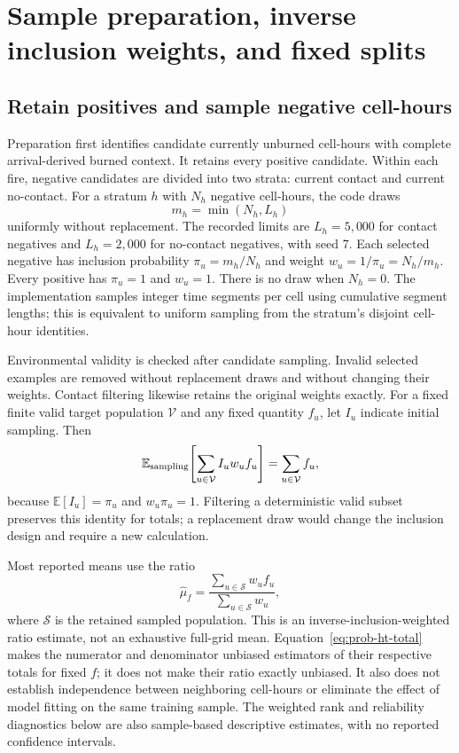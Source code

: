 \documentclass[11pt,a4paper]{article}
\newcommand{\E}{\mathbb{E}}
\begin{document}
\section{Sample preparation, inverse inclusion weights, and fixed splits}
\label{sec:probability-preparation}

\subsection{Retain positives and sample negative cell-hours}

Preparation first identifies candidate currently unburned cell-hours with
complete arrival-derived burned context. It retains every positive candidate.
Within each fire, negative candidates are divided into two strata: current
contact and current no-contact. For a stratum $h$ with $N_h$ negative
cell-hours, the code draws
\begin{equation}
 m_h=\min(N_h,L_h)
\end{equation}
uniformly without replacement. The recorded limits are $L_h=5{,}000$ for
contact negatives and $L_h=2{,}000$ for no-contact negatives, with seed 7.
Each selected negative has inclusion probability $\pi_u=m_h/N_h$ and
weight $w_u=1/\pi_u=N_h/m_h$. Every positive has $\pi_u=1$ and $w_u=1$.
There is no draw when $N_h=0$. The implementation samples integer time
segments per cell using cumulative segment lengths; this is equivalent to
uniform sampling from the stratum's disjoint cell-hour identities.

Environmental validity is checked after candidate sampling. Invalid selected
examples are removed without replacement draws and without changing their
weights. Contact filtering likewise retains the original weights exactly.
For a fixed finite valid target population $\mathcal V$ and any fixed
quantity $f_u$, let $I_u$ indicate initial sampling. Then
\begin{equation}
 \E_{\rm sampling}\!\left[
   \sum_{u\in\mathcal V}I_uw_uf_u
 \right]
 =\sum_{u\in\mathcal V}f_u,
 \label{eq:prob-ht-total}
\end{equation}
because $\E[I_u]=\pi_u$ and $w_u\pi_u=1$. Filtering a deterministic valid
subset preserves this identity for totals; a replacement draw would change
the inclusion design and require a new calculation.

Most reported means use the ratio
\begin{equation}
 \widehat\mu_f=\frac{\sum_{u\in\mathcal S}w_uf_u}
                    {\sum_{u\in\mathcal S}w_u},
 \label{eq:prob-ratio-mean}
\end{equation}
where $\mathcal S$ is the retained sampled population. This is an
inverse-inclusion-weighted ratio estimate, not an exhaustive full-grid mean.
Equation~\eqref{eq:prob-ht-total} makes the numerator and denominator unbiased
estimators of their respective totals for fixed $f$; it does not make their
ratio exactly unbiased. It also does not establish independence between
neighboring cell-hours or eliminate the effect of model fitting on the same
training sample. The weighted rank and reliability diagnostics below are
also sample-based descriptive estimates, with no reported confidence intervals.
\end{document}
